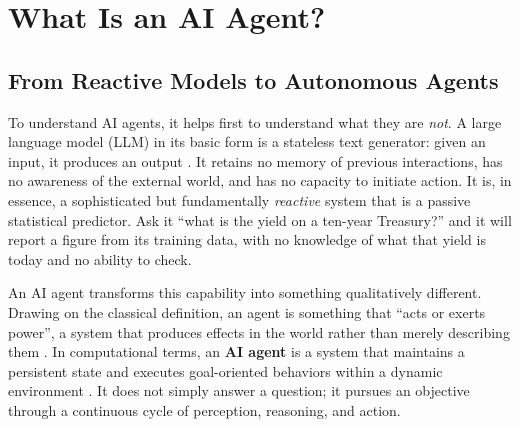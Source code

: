 \documentclass{article}
\begin{document}




\section{What Is an AI Agent?}
\label{sec:what-is-agent}

\subsection{From Reactive Models to Autonomous Agents}

To understand AI agents, it helps first to understand what they are \textit{not}. A large language model (LLM) in its basic form is a stateless text generator: given an input, it produces an output \cite{vaswani2017attention}. It retains no memory of previous interactions, has no awareness of the external world, and has no capacity to initiate action. It is, in essence, a sophisticated but fundamentally \textit{reactive} system that is a passive statistical predictor. Ask it ``what is the yield on a ten-year Treasury?'' and it will report a figure from its training data, with no knowledge of what that yield is today and no ability to check.

An AI agent transforms this capability into something qualitatively different. Drawing on the classical definition, an agent is something that ``acts or exerts power'', a system that produces effects in the world rather than merely describing them \cite{merriam-webster}. In computational terms, an \textbf{AI agent} is a system that maintains a persistent state and executes goal-oriented behaviors within a dynamic environment \cite{wooldridge1995intelligent}. It does not simply answer a question; it pursues an objective through a continuous cycle of perception, reasoning, and action.
\end{document}
